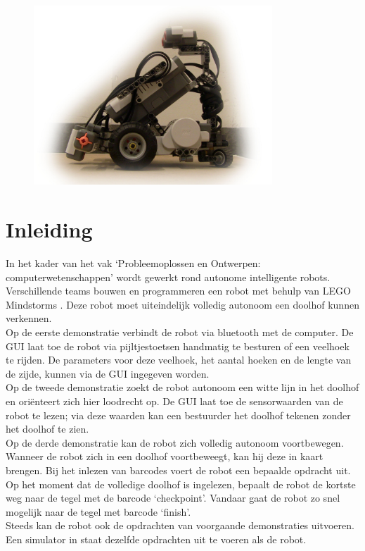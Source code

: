 \documentclass[eind]{penoverslag}
\begin{document}
\begin{figure}[!hb]
\begin{flushright}
    \includegraphics[width=0.8\textwidth]{robotFP}
    \label{fig:robotFP}
\end{flushright}
\end{figure}

\newpage
\setcounter{tocdepth}{2}
\tableofcontents

\newpage
\listoftables
\listoffigures

\thispagestyle{empty}

\newpage 

\section{Inleiding} %
\label{ssec:inl}
In het kader van het vak `Probleemoplossen en Ontwerpen: computerwetenschappen' wordt gewerkt rond autonome intelligente robots. Verschillende teams bouwen en programmeren een robot met behulp van LEGO Mindstorms \cite{mindstorms}. Deze robot moet uiteindelijk volledig autonoom een doolhof kunnen verkennen.\\

Op de eerste demonstratie verbindt de robot via bluetooth met de computer. De GUI laat toe de robot via pijltjestoetsen handmatig te besturen of een veelhoek te rijden. De parameters voor deze veelhoek, het aantal hoeken en de lengte van de zijde, kunnen via de GUI ingegeven worden.\\
Op de tweede demonstratie zoekt de robot autonoom een witte lijn in het doolhof en ori\"enteert zich hier loodrecht op. De GUI laat toe de sensorwaarden van de robot te lezen; via deze waarden kan een bestuurder het doolhof tekenen zonder het doolhof te zien.\\
Op de derde demonstratie kan de robot zich volledig autonoom voortbewegen. Wanneer de robot zich in een doolhof voortbeweegt, kan hij deze in kaart brengen. Bij het inlezen van barcodes voert de robot een bepaalde opdracht uit. Op het moment dat de volledige doolhof is ingelezen, bepaalt de robot de kortste weg naar de tegel met de barcode `checkpoint'. Vandaar gaat de robot zo snel mogelijk naar de tegel met barcode `finish'.\\
Steeds kan de robot ook de opdrachten van voorgaande demonstraties uitvoeren. Een simulator in staat dezelfde opdrachten uit te voeren als de robot.
\end{document}
